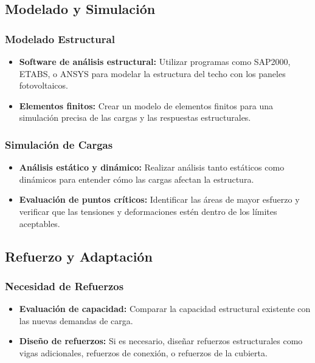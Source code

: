 \documentclass[a4paper,12pt]{article}
\begin{document}
\begin{Form}
\subsection*{Modelado y Simulación}

\subsubsection*{Modelado Estructural}
\begin{itemize}
    \item \textbf{Software de análisis estructural:} Utilizar programas como SAP2000, ETABS, o ANSYS para modelar la estructura del techo con los paneles fotovoltaicos.
    \item \textbf{Elementos finitos:} Crear un modelo de elementos finitos para una simulación precisa de las cargas y las respuestas estructurales.
\end{itemize}

\subsubsection*{Simulación de Cargas}
\begin{itemize}
    \item \textbf{Análisis estático y dinámico:} Realizar análisis tanto estáticos como dinámicos para entender cómo las cargas afectan la estructura.
    \item \textbf{Evaluación de puntos críticos:} Identificar las áreas de mayor esfuerzo y verificar que las tensiones y deformaciones estén dentro de los límites aceptables.
\end{itemize}

\subsection*{Refuerzo y Adaptación}

\subsubsection*{Necesidad de Refuerzos}
\begin{itemize}
    \item \textbf{Evaluación de capacidad:} Comparar la capacidad estructural existente con las nuevas demandas de carga.
    \item \textbf{Diseño de refuerzos:} Si es necesario, diseñar refuerzos estructurales como vigas adicionales, refuerzos de conexión, o refuerzos de la cubierta.
\end{itemize}


\end{Form}
\end{document}
